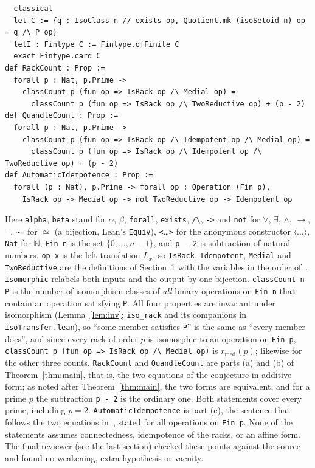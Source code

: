 \documentclass[11pt]{article}
\theoremstyle{definition}
\theoremstyle{remark}
\newcommand{\rmed}{r_{\mathrm{med}}}
\begin{document}
{{\begin{verbatim}
  classical
  let C := {q : IsoClass n // exists op, Quotient.mk (isoSetoid n) op = q /\ P op}
  letI : Fintype C := Fintype.ofFinite C
  exact Fintype.card C
def RackCount : Prop :=
  forall p : Nat, p.Prime ->
    classCount p (fun op => IsRack op /\ Medial op) =
      classCount p (fun op => IsRack op /\ TwoReductive op) + (p - 2)
def QuandleCount : Prop :=
  forall p : Nat, p.Prime ->
    classCount p (fun op => IsRack op /\ Idempotent op /\ Medial op) =
      classCount p (fun op => IsRack op /\ Idempotent op /\ TwoReductive op) + (p - 2)
def AutomaticIdempotence : Prop :=
  forall (p : Nat), p.Prime -> forall op : Operation (Fin p),
    IsRack op -> Medial op -> not TwoReductive op -> Idempotent op
\end{verbatim}}
\noindent Here \texttt{alpha}, \texttt{beta} stand for $\alpha$, $\beta$,
\texttt{forall}, \texttt{exists}, \texttt{/\textbackslash}, \texttt{->} and
\texttt{not} for $\forall$, $\exists$, $\wedge$, $\to$, $\neg$,
\texttt{\textasciitilde=} for $\simeq$ (a bijection, Lean's \texttt{Equiv}),
\texttt{<}\dots\texttt{>} for the anonymous constructor
$\langle\dots\rangle$, \texttt{Nat} for $\mathbb N$, \texttt{Fin n} is the set
$\{0,\dots,n-1\}$, and \texttt{p - 2} is subtraction of natural numbers.
\texttt{op x} is the left translation $L_x$, so \texttt{IsRack},
\texttt{Idempotent}, \texttt{Medial} and \texttt{TwoReductive} are the
definitions of Section~1 with the variables in the order of~\cite{vy}.
\texttt{Isomorphic} relabels both inputs and the output by one bijection.
\texttt{classCount n P} is the number of isomorphism classes of
\emph{all} binary operations on \texttt{Fin n} that contain an operation
satisfying \texttt{P}. All four properties are invariant under isomorphism
(Lemma~\ref{lem:inv}; \texttt{iso\_\allowbreak rack} and its companions in
\texttt{IsoTransfer.lean}), so ``some member satisfies \texttt{P}'' is the
same as ``every member does'', and since every rack of order $p$ is isomorphic
to an operation on \texttt{Fin p}, \texttt{classCount p (fun op => IsRack op
/\textbackslash{} Medial op)} is $\rmed(p)$; likewise for the other three
counts. \texttt{RackCount} and \texttt{QuandleCount} are parts (a) and (b) of
Theorem~\ref{thm:main}, that is, the two equations of the conjecture in
additive form; as noted after Theorem~\ref{thm:main}, the two forms are
equivalent, and for a prime $p$ the subtraction \texttt{p - 2} is the ordinary
one. Both statements cover every prime, including $p=2$.
\texttt{AutomaticIdempotence} is part (c), the sentence that follows the two
equations in~\cite{vy}, stated for all operations on \texttt{Fin p}. None of
the statements assumes connectedness, idempotence of the racks, or an affine
form. The final reviewer (see the last section) checked these points against
the source and found no weakening, extra hypothesis or vacuity.

}
\end{document}
